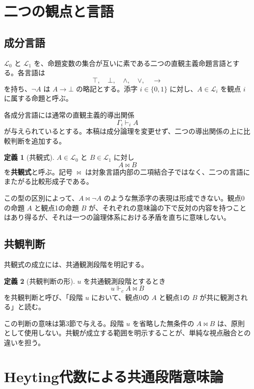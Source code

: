 \documentclass[a4paper,11pt]{ltjsarticle}
\theoremstyle{definition}
\newtheorem{definition}{定義}[section]
\theoremstyle{plain}
\newcommand{\forcesc}{\Vdash_{\!c}}
\begin{document}
\section{二つの観点と言語}

\subsection{成分言語}

$\mathcal L_0$ と $\mathcal L_1$ を、命題変数の集合が互いに素である二つの直観主義命題言語とする。各言語は
\[
 \top,\quad\bot,\quad\land,\quad\lor,\quad\to
\]
を持ち、$\neg A$ は $A\to\bot$ の略記とする。添字 $i\in\{0,1\}$ に対し、$A\in\mathcal L_i$ を観点 $i$ に属する命題と呼ぶ。

各成分言語には通常の直観主義的導出関係
\[
 \Gamma_i\vdash_i A
\]
が与えられているとする。本稿は成分論理を変更せず、二つの導出関係の上に比較判断を追加する。

\begin{definition}[共観式]
$A\in\mathcal L_0$ と $B\in\mathcal L_1$ に対し
\[
 A\bowtie B
\]
を\textbf{共観式}と呼ぶ。記号 $\bowtie$ は対象言語内部の二項結合子ではなく、二つの言語にまたがる比較形成子である。
\end{definition}

この型の区別によって、$A\bowtie\neg A$ のような無添字の表現は形成できない。観点0の命題 $A$ と観点1の命題 $B$ が、それぞれの意味論の下で反対の内容を持つことはあり得るが、それは一つの論理体系における矛盾を直ちに意味しない。

\subsection{共観判断}

共観式の成立には、共通観測段階を明記する。

\begin{definition}[共観判断の形]
$u$ を共通観測段階とするとき
\[
 u\forcesc A\bowtie B
\]
を共観判断と呼び、「段階 $u$ において、観点0の $A$ と観点1の $B$ が共に観測される」と読む。
\end{definition}

この判断の意味は第3節で与える。段階 $u$ を省略した無条件の $A\bowtie B$ は、原則として使用しない。共観が成立する範囲を明示することが、単純な視点融合との違いを担う。

\section{Heyting代数による共通段階意味論}
\end{document}
